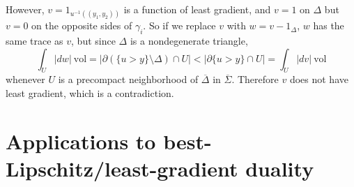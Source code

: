 \documentclass[reqno,12pt,letterpaper]{amsart}
\newcommand{\vol}{\mathrm{vol}}
\theoremstyle{definition}
\numberwithin{equation}{section}
\begin{document}
However, $v = 1_{u^{-1}((y_1, y_2))}$ is a function of least gradient, and $v = 1$ on $\Delta$ but $v = 0$ on the opposite sides of $\gamma_i$.
So if we replace $v$ with $w = v - 1_\Delta$, $w$ has the same trace as $v$, but since $\Delta$ is a nondegenerate triangle,
$$\int_U |dw| ~\vol = |\partial(\{u > y\} \setminus \Delta) \cap U| < |\partial \{u > y\} \cap U| = \int_U |dv| ~\vol$$
whenever $U$ is a precompact neighborhood of $\overline \Delta$ in $\overline \Sigma$.
Therefore $v$ does not have least gradient, which is a contradiction.


\section{Applications to best-Lipschitz/least-gradient duality}
\label{duality}



\printbibliography
\end{document}
